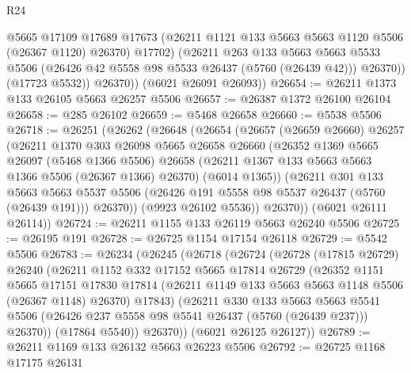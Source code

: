 \begin{lexlean}{R24}
\begin{coremodule}
                @5665
                @17109
                @17689
                @17673
                (@26211 @1121 @133 @5663 @5663 @1120 @5506 (@26367 @1120) @26370)
                @17702)
              (@26211
                @263
                @133
                @5663
                @5663
                @5533
                @5506
                (@26426 @42 @5558 @98 @5533 @26437 (@5760 (@26439 @42)))
                @26370))
            (@17723 @5532))
          @26370))
      (@6021 @26091 @26093))
@26654 := @26211 @1373 @133 @26105 @5663 @26257 @5506
@26657 := @26387 @1372 @26100 @26104
@26658 := @285 @26102
@26659 := @5468 @26658
@26660 := @5538 @5506
@26718 := @26251
    (@26262
      (@26648
        (@26654
          (@26657
            (@26659 @26660)
            @26257
            (@26211
              @1370
              @303
              @26098
              @5665
              @26658
              @26660
              (@26352
                @1369
                @5665
                @26097
                (@5468 @1366 @5506)
                @26658
                (@26211 @1367 @133 @5663 @5663 @1366 @5506 (@26367 @1366) @26370)
                (@6014 @1365))
              (@26211
                @301
                @133
                @5663
                @5663
                @5537
                @5506
                (@26426 @191 @5558 @98 @5537 @26437 (@5760 (@26439 @191)))
                @26370))
            (@9923 @26102 @5536))
          @26370))
      (@6021 @26111 @26114))
@26724 := @26211 @1155 @133 @26119 @5663 @26240 @5506
@26725 := @26195 @191
@26728 := @26725 @1154 @17154 @26118
@26729 := @5542 @5506
@26783 := @26234
    (@26245
      (@26718
        (@26724
          (@26728
            (@17815 @26729)
            @26240
            (@26211
              @1152
              @332
              @17152
              @5665
              @17814
              @26729
              (@26352
                @1151
                @5665
                @17151
                @17830
                @17814
                (@26211 @1149 @133 @5663 @5663 @1148 @5506 (@26367 @1148) @26370)
                @17843)
              (@26211
                @330
                @133
                @5663
                @5663
                @5541
                @5506
                (@26426 @237 @5558 @98 @5541 @26437 (@5760 (@26439 @237)))
                @26370))
            (@17864 @5540))
          @26370))
      (@6021 @26125 @26127))
@26789 := @26211 @1169 @133 @26132 @5663 @26223 @5506
@26792 := @26725 @1168 @17175 @26131

\end{coremodule}
\end{lexlean}

